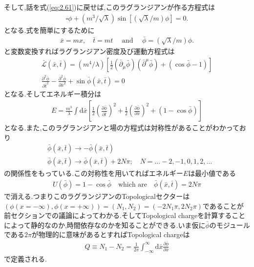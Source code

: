 \documentclass[dvipdfmx,11pt,a4paper,oneside,openany]{jsbook}
\begin{document}
そして,話を式(\ref{eq:2.61})に戻せば,このラグランジアンが作る方程式は
\begin{align*}
    \square \phi+\left(m^{3} / \sqrt{\lambda}\right) \sin [(\sqrt{\lambda} / m) \phi]=0 .
\end{align*}
となる.式を簡単にするために
\begin{align}
    \bar{x}=m x, \quad \bar{t}=m t \quad \text { and } \quad \bar{\phi}=(\sqrt{\lambda} / m) \phi .
\end{align}
と変数変換すればラグランジアン密度及び運動方程式は
\begin{align}
    \bar{\mathscr{L}}(\bar{x}, \bar{t})=\left(m^{4} / \lambda\right)\left[\frac{1}{2}\left(\bar{\partial}_{\mu} \bar{\phi}\right)\left(\bar{\partial}^{\mu} \bar{\phi}\right)+(\cos \bar{\phi}-1)\right]\label{eq:2.64} \\
    \frac{\partial^{2} \bar{\phi}}{\partial \bar{t}^{2}}-\frac{\partial^{2} \bar{\phi}}{\partial \bar{x}^{2}}+\sin \bar{\phi}(\bar{x}, \bar{t})=0\label{eq:2.65}
\end{align}
となる.そしてエネルギー積分は
\begin{align}
    E=\frac{m^{3}}{\lambda} \int \mathrm{d} \bar{x}\left[\frac{1}{2}\left(\frac{\partial \bar{\phi}}{\partial \bar{t}}\right)^{2}+\frac{1}{2}\left(\frac{\partial \bar{\phi}}{\partial \bar{x}}\right)^{2}+(1-\cos \bar{\phi})\right]\label{eq:2.66}
\end{align}
となる.また,このラグランジアンと場の方程式は対称性があることがわかっており
\begin{align}
     & \bar{\phi}(\bar{x}, \bar{t}) \rightarrow-\bar{\phi}(\bar{x}, \bar{t})                                             \\
     & \bar{\phi}(\bar{x}, \bar{t}) \rightarrow \bar{\phi}(\bar{x}, \bar{t})+2 N \pi ; \quad N=\ldots-2,-1,0,1,2, \ldots
\end{align}
の関係性をもっている.この対称性を用いてればエネルギー$E$は最小値である
\begin{align}
    U(\bar{\phi})=1-\cos \bar{\phi}\quad \text{which are} \quad \bar{\phi}(\bar{x}, \bar{t})=2 N \pi
\end{align}
で消える.つまりこのラグランジアンのTopologicalセクターは$\left(\phi(x=-\infty),\phi(x=+\infty)\right)=(N_1,N_2)=(-2N_1\pi, 2N_2\pi)$であることが前セクションでの議論によってわかる.そしてTopological chargeを計算することによって静的なのか,時間依存なのかを知ることができる.いま仮に$\bar{\phi}$のモジュールである$2\pi$が物理的に意味があるとすればTopological chargeは
\begin{align}
    Q \equiv N_{1}-N_{2}=\frac{1}{2 \pi} \int_{-\infty}^{\infty} \mathrm{d} \bar{x} \frac{\partial \bar{\phi}}{\partial \bar{x}}
\end{align}
で定義される.
\end{document}
